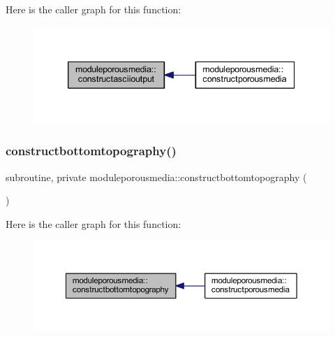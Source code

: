 Here is the caller graph for this function\+:\nopagebreak
\begin{figure}[H]
\begin{center}
\leavevmode
\includegraphics[width=339pt]{namespacemoduleporousmedia_a14d726826714b21efcb1bdd8fe521dbc_icgraph}
\end{center}
\end{figure}
\mbox{\label{namespacemoduleporousmedia_a3f70a3e3d6c8c8f18b17f1417b314f3e}} 
\subsubsection{\texorpdfstring{constructbottomtopography()}{constructbottomtopography()}}
{\footnotesize\ttfamily subroutine, private moduleporousmedia\+::constructbottomtopography (\begin{DoxyParamCaption}{ }\end{DoxyParamCaption})\hspace{0.3cm}{\ttfamily [private]}}

Here is the caller graph for this function\+:\nopagebreak
\begin{figure}[H]
\begin{center}
\leavevmode
\includegraphics[width=350pt]{namespacemoduleporousmedia_a3f70a3e3d6c8c8f18b17f1417b314f3e_icgraph}
\end{center}
\end{figure}
\mbox{\label{namespacemoduleporousmedia_ac4e498c09f58d0ecca6f79a2a268bb84}} 
